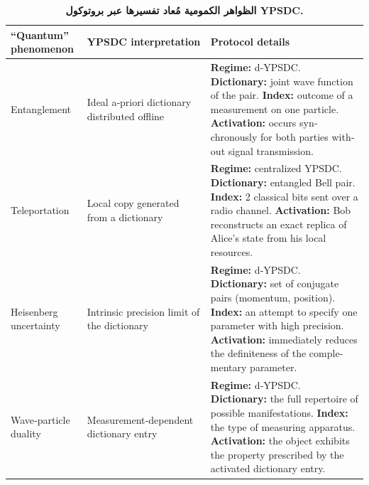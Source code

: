 \documentclass[12pt,a4paper]{article}
\theoremstyle{remark}
\begin{document}
	\begin{otherlanguage}{english}
		\begin{table}[htbp]
			\centering
			\caption{\normalsize\textbf{الظواهر الكمومية مُعاد تفسيرها عبر بروتوكول YPSDC.}}
			\label{tab:quantum-ypsdc}
			\small
			\begin{tabular}{p{2.5cm} p{4.8cm} p{7.8cm}}
				\toprule
				\textbf{``Quantum'' phenomenon} &
				\textbf{YPSDC interpretation} &
				\textbf{Protocol details} \\
				\midrule
				Entanglement &
				Ideal a‑priori dictionary distributed offline &
				\textbf{Regime:} d‑YPSDC. \newline
				\textbf{Dictionary:} joint wave function of the pair. \newline
				\textbf{Index:} outcome of a measurement on one particle. \newline
				\textbf{Activation:} occurs synchronously for both parties without signal transmission. \\
				\midrule
				Teleportation &
				Local copy generated from a dictionary &
				\textbf{Regime:} centralized YPSDC. \newline
				\textbf{Dictionary:} entangled Bell pair. \newline
				\textbf{Index:} 2 classical bits sent over a radio channel. \newline
				\textbf{Activation:} Bob reconstructs an exact replica of Alice's state from his local resources. \\
				\midrule
				Heisenberg uncertainty &
				Intrinsic precision limit of the dictionary &
				\textbf{Regime:} d‑YPSDC. \newline
				\textbf{Dictionary:} set of conjugate pairs (momentum, position). \newline
				\textbf{Index:} an attempt to specify one parameter with high precision. \newline
				\textbf{Activation:} immediately reduces the definiteness of the complementary parameter. \\
				\midrule
				Wave‑particle duality &
				Measurement‑dependent dictionary entry &
				\textbf{Regime:} d‑YPSDC. \newline
				\textbf{Dictionary:} the full repertoire of possible manifestations. \newline
				\textbf{Index:} the type of measuring apparatus. \newline
				\textbf{Activation:} the object exhibits the property prescribed by the activated dictionary entry. \\

\end{tabular}
\end{table}
\end{otherlanguage}
\end{document}
